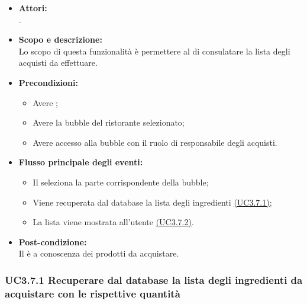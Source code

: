 \begin{itemize}
	\item \textbf{Attori:}
	\\.
	\item \textbf{Scopo e descrizione:} 
	\\Lo scopo di questa funzionalità è permettere al  di consulatare la lista degli acquisti da effettuare.
	\item \textbf{Precondizioni:}
	\begin{itemize}
		\item Avere ;
		\item Avere la bubble del ristorante selezionato;
		\item Avere accesso alla bubble con il ruolo di responsabile degli acquisti.
	\end{itemize}
	\item \textbf{Flusso principale degli eventi:}
	\begin{itemize}
		\item Il  seleziona la parte corrispondente della bubble;
		\item Viene recuperata dal database la lista degli ingredienti \hyperref[UC3.7.1]{(UC3.7.1)};
		\item La lista viene mostrata all’utente \hyperref[UC3.7.2]{(UC3.7.2)}.
	\end{itemize}
	\item \textbf{Post-condizione:}
	\\Il {} è a conoscenza dei prodotti da acquistare.
\end{itemize}

\subsubsection{UC3.7.1 Recuperare dal database la lista degli ingredienti da acquistare con le rispettive quantità} \label{UC3.7.1}

